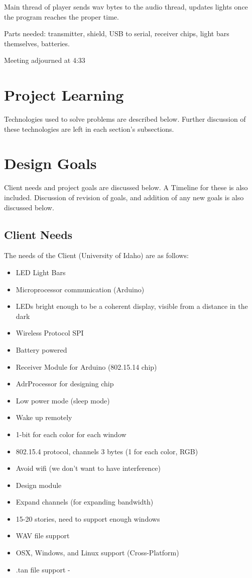 \documentclass[12pt]{article}
\begin{document}
Main thread of player sends wav bytes to the audio thread, updates lights once the program reaches the proper time. 

Parts needed: transmitter, shield, USB to serial, receiver chips, light bars themselves, batteries. 

Meeting adjourned at 4:33
	
	\clearpage

\section{Project Learning}
	Technologies used to solve problems are described below. Further discussion of these technologies are left in each section's subsections.

	\newpage
  
\section{Design Goals}
	Client needs and project goals are discussed below. A Timeline for these is also included. Discussion of revision of goals, and addition of any new goals is also discussed below.
	
	\subsection{Client Needs}
	The needs of the Client (University of Idaho) are as follows:
		
		\begin{itemize}
			\item LED Light Bars
			\item Microprocessor communication (Arduino)
			\item LEDs bright enough to be a coherent display, visible from a distance in the dark
			\item Wireless Protocol SPI
			\item Battery powered
			\item Receiver Module for Arduino (802.15.14 chip) 
			\item AdrProcessor for designing chip
			\item Low power mode (sleep mode)
			\item Wake up remotely
			\item 1-bit for each color for each window
			\item 802.15.4 protocol, channels 3 bytes (1 for each color, RGB)
			\item Avoid wifi (we don't want to have interference)
			\item Design module
			\item Expand channels (for expanding bandwidth)
			\item 15-20 stories, need to support enough windows
			\item WAV file support
			\item OSX, Windows, and Linux support (Cross-Platform)
			\item .tan file support - 
		\end{itemize}
	
\end{document}

